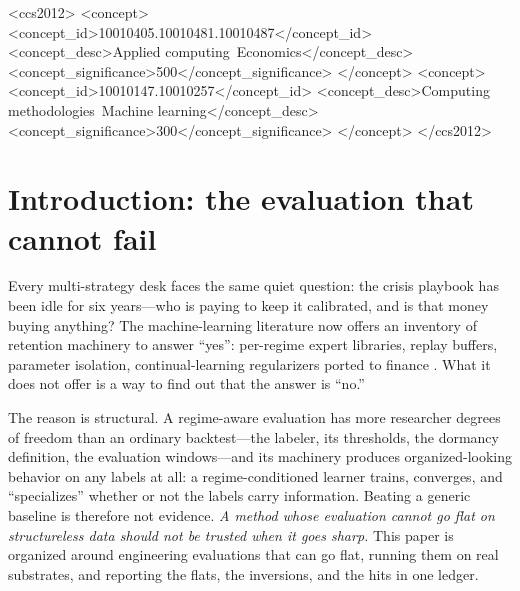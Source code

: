 \documentclass[sigconf,anonymous]{acmart}
\begin{document}
\begin{CCSXML}
<ccs2012>
<concept>
<concept_id>10010405.10010481.10010487</concept_id>
<concept_desc>Applied computing~Economics</concept_desc>
<concept_significance>500</concept_significance>
</concept>
<concept>
<concept_id>10010147.10010257</concept_id>
<concept_desc>Computing methodologies~Machine learning</concept_desc>
<concept_significance>300</concept_significance>
</concept>
</ccs2012>
\end{CCSXML}


\maketitle

\section{Introduction: the evaluation that cannot fail}
\label{sec:intro}

Every multi-strategy desk faces the same quiet question: the crisis
playbook has been idle for six years---who is paying to keep it
calibrated, and is that money buying anything? The machine-learning
literature now offers an inventory of retention machinery to answer
``yes'': per-regime expert libraries, replay buffers, parameter isolation,
continual-learning regularizers ported to finance
\cite{philps2018continual,pan2026recap,kirkpatrick2017overcoming,
rolnick2019experience,parisi2019continual}. What it does not offer is a
way to find out that the answer is ``no.''

The reason is structural. A regime-aware evaluation has more researcher
degrees of freedom than an ordinary backtest---the labeler, its
thresholds, the dormancy definition, the evaluation windows---and its
machinery produces organized-looking behavior on any labels at all: a
regime-conditioned learner trains, converges, and ``specializes'' whether
or not the labels carry information. Beating a generic baseline is
therefore not evidence. \emph{A method whose evaluation cannot go flat on
structureless data should not be trusted when it goes sharp.} This paper
is organized around engineering evaluations that can go flat, running
them on real substrates, and reporting the flats, the inversions, and the
hits in one ledger.
\end{document}
